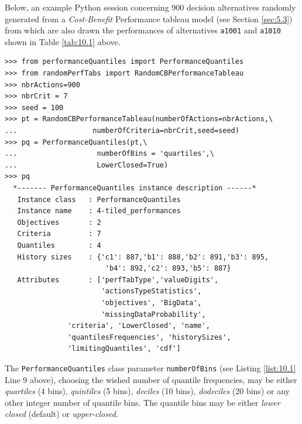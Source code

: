 Below, an example Python session concerning 900 decision alternatives randomly generated from a \emph{Cost-Benefit} Performance tableau model (see Section \ref{sec:5.3}) from which are also drawn the performances of alternatives \texttt{a1001} and \texttt{a1010} shown in Table \ref{tab:10.1} above.
\begin{lstlisting}[caption={Computing performance quantiles from a given performance tableau},label=list:10.1]
>>> from performanceQuantiles import PerformanceQuantiles
>>> from randomPerfTabs import RandomCBPerformanceTableau
>>> nbrActions=900
>>> nbrCrit = 7
>>> seed = 100
>>> pt = RandomCBPerformanceTableau(numberOfActions=nbrActions,\
...                  numberOfCriteria=nbrCrit,seed=seed)
>>> pq = PerformanceQuantiles(pt,\
...                   numberOfBins = 'quartiles',\
...                   LowerClosed=True)
>>> pq
  *------- PerformanceQuantiles instance description ------*
   Instance class   : PerformanceQuantiles
   Instance name    : 4-tiled_performances
   Objectives       : 2
   Criteria         : 7
   Quantiles        : 4
   History sizes    : {'c1': 887,'b1': 888,'b2': 891,'b3': 895,
                        'b4': 892,'c2': 893,'b5': 887}
   Attributes       : ['perfTabType','valueDigits',
                       'actionsTypeStatistics',
                       'objectives', 'BigData',
                       'missingDataProbability',
		       'criteria', 'LowerClosed', 'name',
		       'quantilesFrequencies', 'historySizes',
		       'limitingQuantiles', 'cdf']
\end{lstlisting}
The \texttt{PerformanceQuantiles} class parameter \texttt{numberOfBins} (see Listing \ref{list:10.1} Line 9 above), choosing the wished number of quantile frequencies, may be either \emph{quartiles} (4 bins), \emph{quintiles} (5 bins), \emph{deciles} (10 bins), \emph{dodeciles} (20 bins) or any other integer number of quantile bins. The quantile bins may be either \emph{lower closed} (default) or \emph{upper-closed}.

